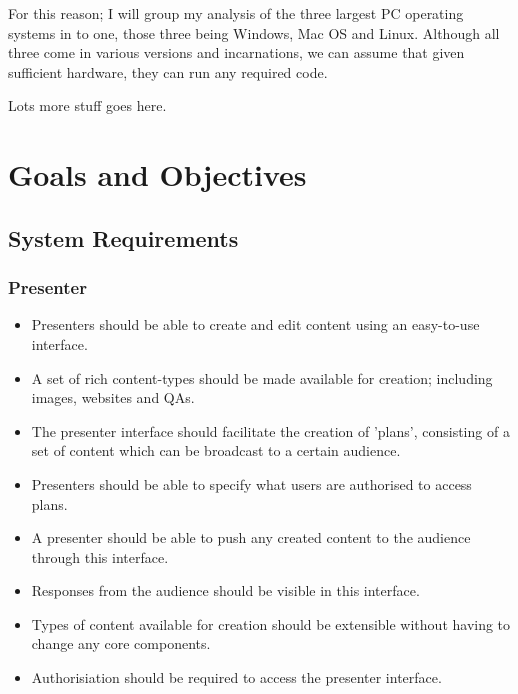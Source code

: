 \documentclass[a4papert,11pt,notitlepage]{ltxdoc}
\begin{document}
For this reason; I will group my analysis of the three largest PC operating systems in to one, those three being Windows, Mac OS and Linux. Although all three come in various versions and incarnations, we can assume that given sufficient hardware, they can run any required code.

Lots more stuff goes here.

\section{Goals and Objectives}
\subsection{System Requirements}
\subsubsection{Presenter}
\begin{itemize}
\item Presenters should be able to create and edit content using an easy-to-use interface.
\item A set of rich content-types should be made available for creation; including images, websites and QAs.
\item The presenter interface should facilitate the creation of 'plans', consisting of a set of content which can be broadcast to a certain audience.
\item Presenters should be able to specify what users are authorised to access plans.
\item A presenter should be able to push any created content to the audience through this interface.
\item Responses from the audience should be visible in this interface.
\item Types of content available for creation should be extensible without having to change any core components.
\item Authorisiation should be required to access the presenter interface.
\end{itemize}
\end{document}

